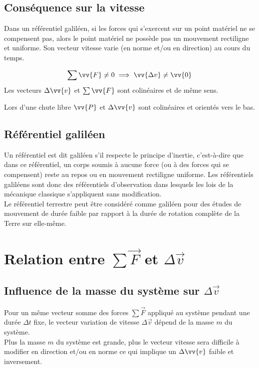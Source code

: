 \documentclass[a4paper,11pt,fleqn]{scrartcl}%
\begin{document}
        \subsection{Conséquence sur la vitesse}
        Dans un référentiel galiléen, si les forces qui s'exercent sur un point matériel ne se compensent pas, alors le point matériel ne possède pas un mouvement rectiligne et uniforme. Son vecteur vitesse varie (en norme et/ou en direction) au cours du temps.
        \begin{center}
            $$\sum \vv{F} \neq 0 \implies \vv{\Delta v} \neq \vv{0}$$
            Les vecteurs $\Delta \vv{v}$ et $\sum \vv{F}$ sont colinéaires et de même sens.
        \end{center}
Lors d'une chute libre $\vv{P}$ et $\Delta \vv{v}$ sont colinéaires et orientés vers le bas.

        \subsection{Référentiel galiléen}
        Un référentiel est dit galiléen s'il respecte le principe d'inertie, c'est-à-dire que dans ce référentiel, un corps soumis à aucune force (ou à des forces qui se compensent) reste au repos ou en mouvement rectiligne uniforme. Les référentiels galiléens sont donc des référentiels d'observation dans lesquels les lois de la mécanique classique s'appliquent sans modification.\\
        Le référentiel terrestre peut être considéré comme galiléen pour des études de mouvement de durée faible par rapport à la durée de rotation complète de la Terre sur elle-même.

\section{Relation entre $\sum \vec{F}$ et $\Delta \vec{v}$}

    \subsection{Influence de la masse du système sur $\Delta \vec{v}$}

    Pour un même vecteur somme des forces $\sum \vec{F}$ appliqué au système pendant une durée $\Delta t$ fixe, le vecteur variation de vitesse $\Delta \vec{v}$ dépend de la masse $m$ du système.\\
    Plus la masse $m$ du système est grande, plus le vecteur vitesse sera difficile à modifier en direction et/ou en norme ce qui implique un $\Delta \vv{v}$ faible et inversement.\\
\end{document}
